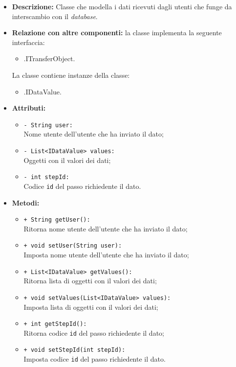 \begin{flushleft}
\begin{itemize}
\item \textbf{Descrizione:} Classe che modella i dati ricevuti dagli utenti che funge da interscambio  con il \textit{database}.
\item \textbf{Relazione con altre componenti:} la classe implementa la seguente interfaccia:
		\begin{itemize}
			\item \smodel{}.ITransferObject.
		\end{itemize}
				La classe contiene instanze della classe:
		\begin{itemize}
			\item \smodel{}.IDataValue.
		\end{itemize}
\item \textbf{Attributi:}
\begin{sloppypar}
\begin{itemize}
\item \texttt{- String user:}\\ Nome utente dell'utente che ha inviato il dato;
\item \texttt{- List<IDataValue> values:}\\ Oggetti con il valori dei dati;
\item \texttt{- int stepId:}\\Codice \texttt{id} del passo richiedente il dato.
\end{itemize}
\end{sloppypar}
\item \textbf{Metodi:}
\begin{sloppypar}
\begin{itemize}
\item \texttt{+ String getUser():}\\ Ritorna nome utente dell'utente che ha inviato il dato;
\item \texttt{+ void setUser(String user):}\\ Imposta nome utente dell'utente che ha inviato il dato;
\item \texttt{+ List<IDataValue> getValues():}\\ Ritorna lista di oggetti con il valori dei dati;
\item \texttt{+ void setValues(List<IDataValue> values):}\\ Imposta lista di oggetti con il valori dei dati;
\item \texttt{+ int getStepId():}\\ Ritorna codice \texttt{id} del passo richiedente il dato;
\item \texttt{+ void setStepId(int stepId):}\\ Imposta codice \texttt{id} del passo richiedente il dato.
\end{itemize}
\end{sloppypar}
\end{itemize}
\end{flushleft}


